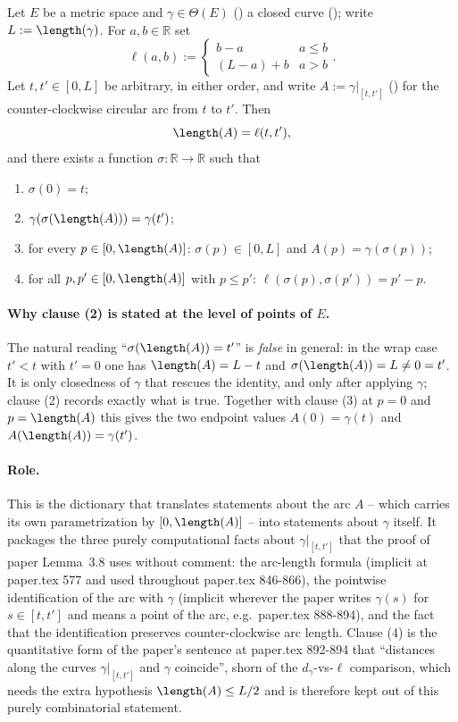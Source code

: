 \begin{lemma}
  \label{curve-arc-eval}
  Let $E$ be a metric space and $\gamma \in \Theta(E)$ () a closed curve
  (); write $L := \length(\gamma)$. For $a,b \in \mathbb{R}$ set
  \[
    \ell(a,b) := \begin{cases} b-a & a \le b \\ (L-a)+b & a > b \end{cases}
    .
  \]
  Let $t,t' \in [0,L]$ be arbitrary, in either order, and write $A := \gamma|_{[t,t']}$
  () for the counter-clockwise circular arc from $t$ to $t'$. Then
  \[
    \length(A) = \ell(t,t')
    ,
  \]
  and there exists a function $\sigma \colon \mathbb{R} \to \mathbb{R}$ such that
  \begin{enumerate}
    \item $\sigma(0) = t$;
    \item $\gamma(\sigma(\length(A))) = \gamma(t')$;
    \item for every $p \in [0,\length(A)]$: $\sigma(p) \in [0,L]$ and $A(p) = \gamma(\sigma(p))$;
    \item for all $p,p' \in [0,\length(A)]$ with $p \le p'$: $\ell(\sigma(p),\sigma(p')) = p'-p$.
  \end{enumerate}

  \paragraph{Why clause (2) is stated at the level of points of $E$.} The natural reading
  ``$\sigma(\length(A)) = t'$'' is \emph{false} in general: in the wrap case $t' < t$ with $t' = 0$
  one has $\length(A) = L-t$ and $\sigma(\length(A)) = L \ne 0 = t'$. It is only closedness of
  $\gamma$ that rescues the identity, and only after applying $\gamma$; clause (2) records exactly
  what is true. Together with clause (3) at $p = 0$ and $p = \length(A)$ this gives the two
  endpoint values $A(0) = \gamma(t)$ and $A(\length(A)) = \gamma(t')$.

  \paragraph{Role.} This is the dictionary that translates statements about the arc $A$ -- which
  carries its own parametrization by $[0,\length(A)]$ -- into statements about $\gamma$ itself.
  It packages the three purely computational facts about $\gamma|_{[t,t']}$ that the proof of
  paper Lemma~3.8 uses without comment: the arc-length formula (implicit at paper.tex 577 and
  used throughout paper.tex 846-866), the pointwise identification of the arc with $\gamma$
  (implicit wherever the paper writes $\gamma(s)$ for $s \in [t,t']$ and means a point of the arc,
  e.g.\ paper.tex 888-894), and the fact that the identification preserves counter-clockwise arc
  length. Clause (4) is the quantitative form of the paper's sentence at paper.tex 892-894 that
  ``distances along the curves $\gamma|_{[t,t']}$ and $\gamma$ coincide'', shorn of the
  $d_\gamma$-vs-$\ell$ comparison, which needs the extra hypothesis $\length(A) \le L/2$ and is
  therefore kept out of this purely combinatorial statement.
\end{lemma}
